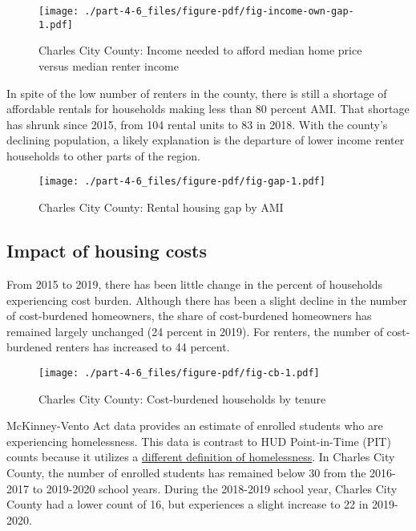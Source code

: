 \documentclass[
  letterpaper,
  DIV=11,
  numbers=noendperiod]{scrreprt}
\begin{document}
\begin{figure}

{\centering \texttt{[image: ./part-4-6\_files/figure-pdf/fig-income-own-gap-1.pdf]}

}

\caption{\label{fig-income-own-gap}Charles City County: Income needed to
afford median home price versus median renter income}

\end{figure}

In spite of the low number of renters in the county, there is still a
shortage of affordable rentals for households making less than 80
percent AMI. That shortage has shrunk since 2015, from 104 rental units
to 83 in 2018. With the county's declining population, a likely
explanation is the departure of lower income renter households to other
parts of the region.

\begin{figure}

{\centering \texttt{[image: ./part-4-6\_files/figure-pdf/fig-gap-1.pdf]}

}

\caption{\label{fig-gap}Charles City County: Rental housing gap by AMI}

\end{figure}

\hypertarget{impact-of-housing-costs-4}{%
\subsection{Impact of housing costs}\label{impact-of-housing-costs-4}}

From 2015 to 2019, there has been little change in the percent of
households experiencing cost burden. Although there has been a slight
decline in the number of cost-burdened homeowners, the share of
cost-burdened homeowners has remained largely unchanged (24 percent in
2019). For renters, the number of cost-burdened renters has increased to
44 percent.

\begin{figure}

{\centering \texttt{[image: ./part-4-6\_files/figure-pdf/fig-cb-1.pdf]}

}

\caption{\label{fig-cb}Charles City County: Cost-burdened households by
tenure}

\end{figure}

McKinney-Vento Act data provides an estimate of enrolled students who
are experiencing homelessness. This data is contrast to HUD
Point-in-Time (PIT) counts because it utilizes a
\href{https://nche.ed.gov/mckinney-vento-definition/}{different
definition of homelessness}. In Charles City County, the number of
enrolled students has remained below 30 from the 2016-2017 to 2019-2020
school years. During the 2018-2019 school year, Charles City County had
a lower count of 16, but experiences a slight increase to 22 in
2019-2020.
\end{document}
